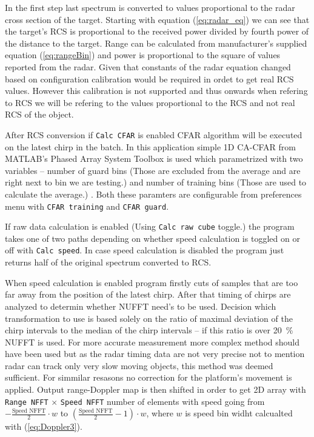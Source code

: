 In the first step last spectrum is converted to values proportional to the radar cross section of the target.
Starting with equation (\ref{eq:radar_eq}) we can see that the target's RCS is proportional to the received power divided by fourth power of the distance to the target.
Range can be calculated from manufacturer's supplied equation (\ref{eq:rangeBin}) and power is proportional to the square of values reported from the radar.
Given that constants of the radar equation changed based on configuration calibration would be required in ordet to get real RCS values.
However this calibration is not supported and thus onwards when refering to RCS we will be refering to the values proportional to the RCS and not real RCS of the object.

After RCS conversion if \texttt{Calc CFAR} is enabled CFAR algorithm will be executed on the latest chirp in the batch.
In this application simple 1D CA-CFAR from MATLAB's Phased Array System Toolbox is used which parametrized with two variables -- number of guard bins (Those are excluded from the average and are right next to bin we are testing.) and number of training bins (Those are used to calculate the average.) \cite{matlab_cfar}.
Both these paramters are configurable from preferences menu with \texttt{CFAR training} and \texttt{CFAR guard}.

If raw data calculation is enabled (Using \texttt{Calc raw cube} toggle.) the program takes one of two paths depending on whether speed calculation is toggled on or off with \texttt{Calc speed}.
In case speed calculation is disabled the program just returns half of the original spectrum converted to RCS.

When speed calculation is enabled program firstly cuts of samples that are too far away from the position of the latest chirp.
After that timing of chirps are analyzed to determin whether NUFFT need's to be used.
Decision which transformation to use is based solely on the ratio of maximal deviation of the chirp intervals to the median of the chirp intervals -- if this ratio is over 20~\% NUFFT is used.
For more accurate measurement more complex method should have been used but as the radar timing data are not very precise not to mention radar can track only very slow moving objects, this method was deemed sufficient.
For simmilar resasons no correction for the platform's movement is applied.
Output range-Doppler map is then shifted in order to get 2D array with \texttt{Range NFFT} $\times$ \texttt{Speed NFFT} number of elements with speed going from $-\frac{\text{Speed NFFT}}{2}\cdot w $ to  $\left(\frac{\text{Speed NFFT}}{2}-1\right)\cdot w $, where $w$ is speed bin widht calcualted with (\ref{eq:Doppler3}).


